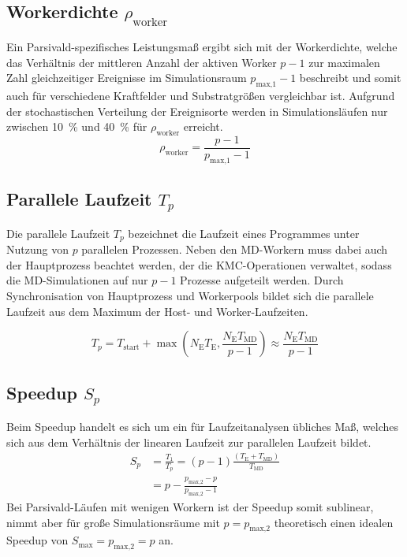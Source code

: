 \subsection{Workerdichte $\rho_\text{worker}$}

Ein Parsivald-spezifisches Leistungsmaß ergibt sich mit der Workerdichte, welche das Verhältnis der mittleren Anzahl der aktiven Worker $p-1$ zur maximalen Zahl gleichzeitiger Ereignisse im Simulationsraum $p_\text{max,1}-1$ beschreibt und somit auch für verschiedene Kraftfelder und Substratgrößen vergleichbar ist.
Aufgrund der stochastischen Verteilung der Ereignisorte werden in Simulationsläufen nur zwischen \SI{10}{\percent} und \SI{40}{\percent} für $\rho_\text{worker}$ erreicht.
\begin{equation}
  \rho_\text{worker} = \frac{p - 1}{p_\text{max,1} - 1}
  \label{eq:workerdensity}
\end{equation}

\subsection{Parallele Laufzeit $T_p$}

Die parallele Laufzeit $T_p$ bezeichnet die Laufzeit eines Programmes unter Nutzung von $p$ parallelen Prozessen.
Neben den MD-Workern muss dabei auch der Hauptprozess beachtet werden, der die KMC-Operationen verwaltet, sodass die MD-Simulationen auf nur $p-1$ Prozesse aufgeteilt werden.
Durch Synchronisation von Hauptprozess und Workerpools bildet sich die parallele Laufzeit aus dem Maximum der Host- und Worker-Laufzeiten.

\begin{equation}
  T_p = T_\text{start} + \max\left(N_\text{E} T_\text{E}, \frac{N_\text{E} T_\text{MD}}{p-1}\right) \approx \frac{N_\text{E} T_\text{MD}}{p-1}
\end{equation}

\subsection{Speedup $S_p$}

Beim Speedup handelt es sich um ein für Laufzeitanalysen übliches Maß, welches sich aus dem Verhältnis der linearen Laufzeit zur parallelen Laufzeit bildet.
\begin{align}
  S_p & = \frac{T_1}{T_p} = \left(p-1\right) \frac{\left(T_\text{E} + T_\text{MD}\right)}{T_\text{MD}} \\
      & = p - \frac{p_\text{max,2} - p}{p_\text{max,2} - 1}
\end{align}
Bei Parsivald-Läufen mit wenigen Workern ist der Speedup somit sublinear, nimmt aber für große Simulationsräume mit $p = p_\text{max,2}$ theoretisch einen idealen Speedup von $S_\text{max} = p_\text{max,2} = p$ an.

